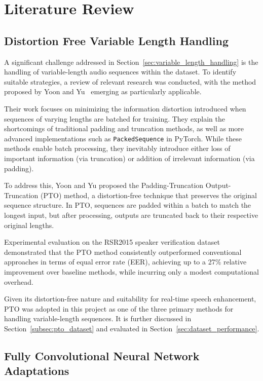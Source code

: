 \graphicspath{{content/chapters/3_literature/figures/}}
\chapter{Literature Review}
\label{sec:literature_review}

\section{Distortion Free Variable Length Handling} 
\label{sec:distortion_free_handling}

A significant challenge addressed in Section~\ref{sec:variable_length_handling} is the handling of variable-length audio sequences within the dataset. To identify suitable strategies, a review of relevant research was conducted, with the method proposed by Yoon and Yu~\cite{yoon2020pto} emerging as particularly applicable.

Their work focuses on minimizing the information distortion introduced when sequences of varying lengths are batched for training. They explain the shortcomings of traditional padding and truncation methods, as well as more advanced implementations such as \texttt{PackedSequence} in PyTorch. While these methods enable batch processing, they inevitably introduce either loss of important information (via truncation) or addition of irrelevant information (via padding).

To address this, Yoon and Yu proposed the Padding-Truncation Output-Truncation (PTO) method, a distortion-free technique that preserves the original sequence structure. In PTO, sequences are padded within a batch to match the longest input, but after processing, outputs are truncated back to their respective original lengths.

Experimental evaluation on the RSR2015 speaker verification dataset demonstrated that the PTO method consistently outperformed conventional approaches in terms of equal error rate (EER), achieving up to a 27\% relative improvement over baseline methods, while incurring only a modest computational overhead.

Given its distortion-free nature and suitability for real-time speech enhancement, PTO was adopted in this project as one of the three primary methods for handling variable-length sequences. It is further discussed in Section~\ref{subsec:pto_dataset} and evaluated in Section~\ref{sec:dataset_performance}.

\section{Fully Convolutional Neural Network Adaptations}
\label{sec:fcns}

